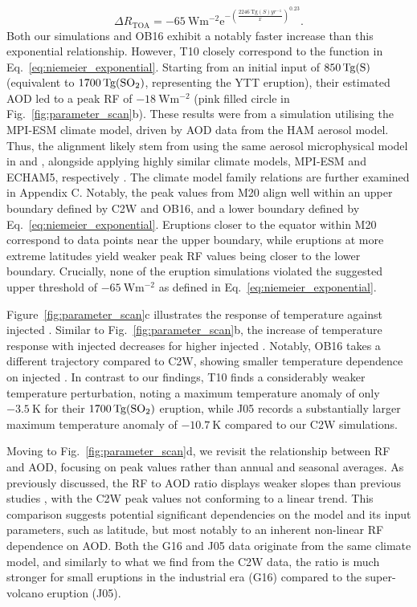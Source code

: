 \documentclass[draft]{agujournal2019}
\newcommand{\iso}[1][i]{{#1}njected \ce{SO2}}
\begin{document}
\begin{equation}
  \Delta
  R_{\mathrm{TOA}} =
  -\SI{65}{\watt\metre^{-2}}
  \mathrm{e}^{-{\left(\frac{\SI{2246}{\tera\gram(S)yr^{-1}}}{x}\right)}^{0.23}}.
  \label{eq:niemeier_exponential}
\end{equation}
%
Both our simulations and OB16 exhibit a notably faster increase than this exponential
relationship. However, T10 closely correspond to the function in
Eq.~\ref{eq:niemeier_exponential}. Starting from an initial input of
\(\SI{850}{\tera\gram(\ce{S})}\) (equivalent to \(\SI{1700}{\tera\gram(\ce{SO2})}\),
representing the YTT eruption), their estimated AOD led to a peak RF of
\(\SI{-18}{\watt\metre^{-2}}\) (pink filled circle in Fig.~\ref{fig:parameter_scan}b).
These results were from a simulation utilising the MPI-ESM climate model, driven by AOD
data from the HAM aerosol model. Thus, the alignment likely stem from using the same
aerosol microphysical model in  and , alongside
applying highly similar climate models, MPI-ESM and ECHAM5, respectively
\cite{kuma2023}. The climate model family relations are further examined in Appendix C.
Notably, the peak values from M20 align well within an upper boundary defined by C2W and
OB16, and a lower boundary defined by Eq.~\ref{eq:niemeier_exponential}. Eruptions
closer to the equator within M20 correspond to data points near the upper boundary,
while eruptions at more extreme latitudes yield weaker peak RF values being closer to
the lower boundary. Crucially, none of the eruption simulations violated the suggested
upper threshold of \(\SI{-65}{\watt\metre^{-2}}\) as defined in
Eq.~\ref{eq:niemeier_exponential}.

Figure~\ref{fig:parameter_scan}c illustrates the response of temperature against \iso{}.
Similar to Fig.~\ref{fig:parameter_scan}b, the increase of temperature response with
\iso{} decreases for higher \iso{}. Notably, OB16 takes a different trajectory compared
to C2W, showing smaller temperature dependence on \iso{}. In contrast to our findings,
T10 finds a considerably weaker temperature perturbation, noting a maximum temperature
anomaly of only \(\SI{-3.5}{\kelvin}\) for their \(\SI{1700}{\tera\gram(\ce{SO2})}\)
eruption, while J05 records a substantially larger maximum temperature anomaly of
\(\SI{-10.7}{\kelvin}\) compared to our C2W simulations.

Moving to Fig.~\ref{fig:parameter_scan}d, we revisit the relationship between RF and
AOD, focusing on peak values rather than annual and seasonal averages. As previously
discussed, the RF to AOD ratio displays weaker slopes than previous studies
\cite{jones2005, marshall2020, timmreck2010}, with the C2W peak values not conforming to
a linear trend. This comparison suggests potential significant dependencies on the model
and its input parameters, such as latitude, but most notably to an inherent non-linear
RF dependence on AOD. Both the G16 and J05 data originate from the same climate model,
and similarly to what we find from the C2W data, the ratio is much stronger for small
eruptions in the industrial era (G16) compared to the super-volcano eruption (J05).
\end{document}
